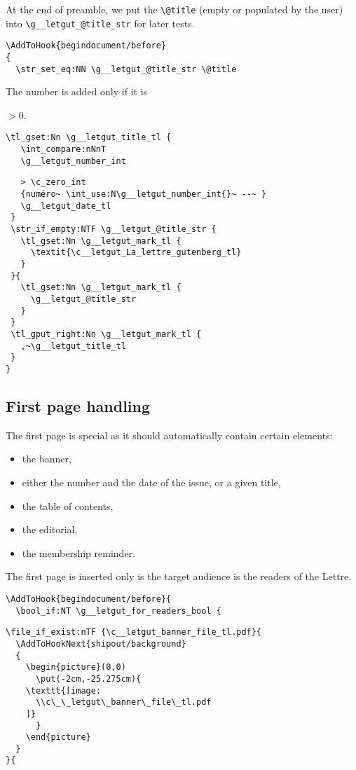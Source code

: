 \documentclass{letgut}
\begin{document}
At the end of preamble, we put the \lstinline+\@title+ (empty or populated by the
user) into \lstinline+\g__letgut_@title_str+ for later tests.
\begin{lstlisting}
\AddToHook{begindocument/before}
{
  \str_set_eq:NN \g__letgut_@title_str \@title
\end{lstlisting}

The number is added only if it is

\(>0\).

\begin{lstlisting}
\tl_gset:Nn \g__letgut_title_tl {
   \int_compare:nNnT
   \g__letgut_number_int
\end{lstlisting}

\begin{lstlisting}
   > \c_zero_int
   {numéro~ \int_use:N\g__letgut_number_int{}~ --~ }
   \g__letgut_date_tl
 }
 \str_if_empty:NTF \g__letgut_@title_str {
   \tl_gset:Nn \g__letgut_mark_tl {
     \textit{\c__letgut_La_lettre_gutenberg_tl}
   }
 }{
   \tl_gset:Nn \g__letgut_mark_tl {
     \g__letgut_@title_str
   }
 }
 \tl_gput_right:Nn \g__letgut_mark_tl {
   ,~\g__letgut_title_tl
 }
}
\end{lstlisting}

\subsection{First page handling}
\label{ImplementationFirstpagehandling-nmmg55h0jlj0}
The first page is special as it should automatically contain certain elements:
\begin{itemize}
\item the banner,
\item either the number and the date of the issue, or a given title,
\item the table of contents,
\item the editorial,
\item the membership reminder.
\end{itemize}

The first page is inserted only is the target audience is the readers of the
Lettre.

\begin{lstlisting}
\AddToHook{begindocument/before}{
  \bool_if:NT \g__letgut_for_readers_bool {
\end{lstlisting}

\begin{lstlisting}
\file_if_exist:nTF {\c__letgut_banner_file_tl.pdf}{
  \AddToHookNext{shipout/background}
  {
    \begin{picture}(0,0)
      \put(-2cm,-25.275cm){
	\texttt{[image: 
	  \\c\_\_letgut\_banner\_file\_tl.pdf
	]}
      }
    \end{picture}
  }
}{
\end{lstlisting}
\end{document}
